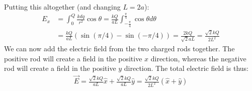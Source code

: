 \begin{solution}
\begin{align*}
	\end{align*}
	Putting this altogether (and changing $L=2a$):
	\begin{align*}
	E_x &= \int_0^Q\frac{kdq}{r^2}\cos\theta = \frac{kQ}{aL}\int_{-\frac{\pi}{4}}^{\frac{\pi}{4}}\cos\theta d\theta\\
	&=\frac{kQ}{aL}(\sin(\pi/4)-\sin(-\pi/4))=\frac{2kQ}{\sqrt{2}aL}=\frac{\sqrt{2}kQ}{2L^2}
	\end{align*}
	We can now add the electric field from the two charged rods together. The positive rod will create a field in the positive $x$ direction, whereas the negative rod will create a field in the positive $y$ direction. The total electric field is thus:
	\begin{align*}
	\vec E = \frac{\sqrt{2}kQ}{aL}\hat x + \frac{\sqrt{2}kQ}{aL}\hat y=\frac{\sqrt{2}kQ}{2L^2}(\hat x + \hat y)
	\end{align*}
\end{solution}


